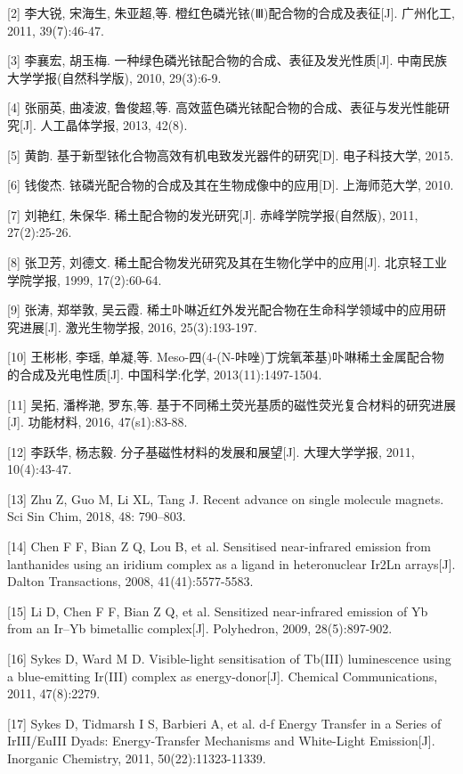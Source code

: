 \documentclass[UTF8,a4paper,10pt,twocolumn]{ctexart}
\begin{document}
\noindent{}[2] 李大锐, 宋海生, 朱亚超,等. 橙红色磷光铱(Ⅲ)配合物的合成及表征[J]. 广州化工, 2011, 39(7):46-47.

\noindent{}[3] 李襄宏, 胡玉梅. 一种绿色磷光铱配合物的合成、表征及发光性质[J]. 中南民族大学学报(自然科学版), 2010, 29(3):6-9.

\noindent{}[4] 张丽英, 曲凌波, 鲁俊超,等. 高效蓝色磷光铱配合物的合成、表征与发光性能研究[J]. 人工晶体学报, 2013, 42(8).

\noindent{}[5] 黄韵. 基于新型铱化合物高效有机电致发光器件的研究[D]. 电子科技大学, 2015.

\noindent{}[6] 钱俊杰. 铱磷光配合物的合成及其在生物成像中的应用[D]. 上海师范大学, 2010.

\noindent{}[7] 刘艳红, 朱保华. 稀土配合物的发光研究[J]. 赤峰学院学报(自然版), 2011, 27(2):25-26.

\noindent{}[8] 张卫芳, 刘德文. 稀土配合物发光研究及其在生物化学中的应用[J]. 北京轻工业学院学报, 1999, 17(2):60-64.

\noindent{}[9] 张涛, 郑举敦, 吴云霞. 稀土卟啉近红外发光配合物在生命科学领域中的应用研究进展[J]. 激光生物学报, 2016, 25(3):193-197.

\noindent{}[10] 王彬彬, 李瑶, 单凝,等. Meso-四(4-(N-咔唑)丁烷氧苯基)卟啉稀土金属配合物的合成及光电性质[J]. 中国科学:化学, 2013(11):1497-1504.

\noindent{}[11] 吴拓, 潘桦滟, 罗东,等. 基于不同稀土荧光基质的磁性荧光复合材料的研究进展[J]. 功能材料, 2016, 47(s1):83-88.

\noindent{}[12] 李跃华, 杨志毅. 分子基磁性材料的发展和展望[J]. 大理大学学报, 2011, 10(4):43-47.

\noindent{}[13] Zhu Z, Guo M, Li XL, Tang J. Recent advance on single molecule magnets. Sci Sin Chim, 2018, 48: 790–803.

\noindent{}[14] Chen F F, Bian Z Q, Lou B, et al. Sensitised near-infrared emission from lanthanides using an iridium complex as a ligand in heteronuclear Ir2Ln arrays[J]. Dalton Transactions, 2008, 41(41):5577-5583.

\noindent{}[15] Li D, Chen F F, Bian Z Q, et al. Sensitized near-infrared emission of Yb from an Ir–Yb bimetallic complex[J]. Polyhedron, 2009, 28(5):897-902.

\noindent{}[16] Sykes D, Ward M D. Visible-light sensitisation of Tb(III) luminescence using a blue-emitting Ir(III) complex as energy-donor[J]. Chemical Communications, 2011, 47(8):2279.

\noindent{}[17] Sykes D, Tidmarsh I S, Barbieri A, et al. d-f Energy Transfer in a Series of IrIII/EuIII Dyads: Energy-Transfer Mechanisms and White-Light Emission[J]. Inorganic Chemistry, 2011, 50(22):11323-11339.
\end{document}
